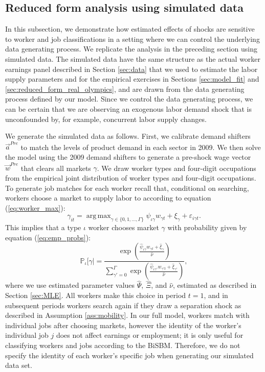 \documentclass[12pt]{article}
\def\ig{\iota\gamma}
\def\g{\gamma}
\def\i{\iota}
\DeclareMathOperator*{\argmax}{arg\,max}
\renewcommand{\P}{\mathbb {P}}
\theoremstyle{definition}
\theoremstyle{plain}
\def\ve{\varepsilon}
\begin{document}
\subsection{Reduced form analysis using simulated data}


\label{sec:reduced_form_fake_olympics}


In this subsection, we demonstrate how estimated effects of shocks are sensitive to worker and job classifications in a setting where we can control the underlying data generating process. We replicate the analysis in the preceding section using simulated data. The simulated data have the same structure as the actual worker earnings panel described in Section \ref{sec:data} that we used to estimate the labor supply parameters and for the empirical exercises in Sections \ref{sec:model_fit} and \ref{sec:reduced_form_real_olympics}, and are drawn from the data generating process defined by our model. Since we control the data generating process, we can be certain that we are observing an exogenous labor demand shock that is unconfounded by, for example, concurrent labor supply changes. 

We generate the simulated data as follows. First, we calibrate demand shifters $\vec{a}^{Pre}$ to match the levels of product demand in each sector in 2009. We then solve the model using the 2009 demand shifters to generate a pre-shock wage vector $\vec{w}^{Pre}$ that clears all markets $\g$. We draw worker types and four-digit occupations from the empirical joint distribution of worker types and four-digit occupations. To generate job matches for each worker recall that, conditional on searching, workers choose a market to supply labor to according to equation (\ref{eq:worker_max}):
\[\g_{it} = \argmax_{\g \in \{0,1,\dots,\Gamma\}} \psi_{\ig} w_{\g t} + \xi_{\g} + \ve_{i\g t} .\] 
This implies that a type $\i$ worker chooses market $\g$ with probability given by equation (\ref{eq:emp_probs}): 
\[\P_{\i}[\g | = \frac{\exp \left( \frac{\hat\psi_{\ig} w_{\g t} + \hat\xi_{\g}}{\hat\nu} \right) }{ \sum\limits_{\g'=0}^{\Gamma} \exp \left( \frac{\hat\psi_{\ig'} w_{\g' t} + \hat\xi_{\g'}}{\hat\nu} \right) },\] 
where we use estimated parameter values $\hat \Psi$, $\hat \Xi$, and $\hat \nu$, estimated as described in Section \ref{sec:MLE}. All workers make this choice in period $t=1$, and in subsequent periods workers search again if they draw a separation shock as described in Assumption \ref{ass:mobility}. In our full model, workers match with individual jobs after choosing markets, however the identity of the worker's individual job $j$ does not affect earnings or employment; it is only useful for classifying workers and jobs according to the BiSBM. Therefore, we do not specify the identity of each worker's specific job when generating our simulated data set. 
\end{document}
